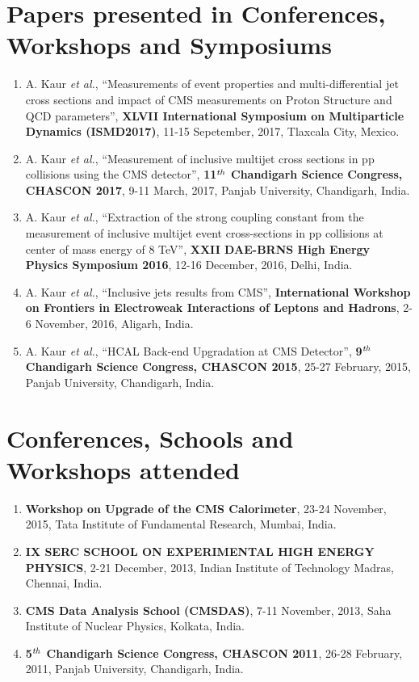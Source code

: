 \section*{Papers presented in Conferences, Workshops and Symposiums}
\begin{enumerate}
\item A. Kaur {\it et al.}, ``Measurements of event properties and multi-differential jet cross sections and impact of CMS measurements on Proton Structure and QCD parameters'', {\bf XLVII International Symposium on Multiparticle Dynamics (ISMD2017)}, 11-15 Sepetember, 2017, Tlaxcala City, Mexico.

\item A. Kaur {\it et al.}, ``Measurement of inclusive multijet cross sections in pp collisions using the CMS detector'', {\bf 11$^{\rm \it th}$ Chandigarh Science Congress, CHASCON 2017}, 9-11 March, 2017, Panjab University, Chandigarh, India.  

\item A. Kaur {\it et al.}, ``Extraction of the strong coupling constant from the measurement of inclusive multijet event cross-sections in pp collisions at center of mass energy of 8 TeV'', {\bf XXII DAE­-BRNS High Energy Physics Symposium 2016}, 12-16 December, 2016, Delhi, India.

\item A. Kaur {\it et al.}, ``Inclusive jets results from CMS'', {\bf International Workshop on Frontiers in Electroweak Interactions of Leptons and Hadrons}, 2-6 November, 2016, Aligarh, India.

\item A. Kaur {\it et al.}, ``HCAL Back-end Upgradation at CMS Detector'', {\bf 9$^{\rm \it th}$ Chandigarh Science Congress, CHASCON 2015}, 25-27 February, 2015, Panjab University, Chandigarh, India.

\end{enumerate}

\noindent\makebox[\textwidth]{\rule{\textwidth}{1pt}} 

\section*{Conferences, Schools and Workshops attended}

\begin{enumerate}

\item {\bf Workshop on Upgrade of the CMS Calorimeter}, 23-24 November, 2015, Tata Institute of Fundamental Research, Mumbai, India.

\item {\bf IX SERC SCHOOL ON EXPERIMENTAL HIGH ENERGY PHYSICS}, 2-21 December, 2013, Indian Institute of Technology Madras, Chennai, India. 

\item {\bf CMS Data Analysis School (CMSDAS)}, 7-11 November, 2013, Saha Institute of Nuclear Physics, Kolkata, India.

\item {\bf 5$^{\it th}$ Chandigarh Science Congress, CHASCON 2011}, 26-28 February, 2011, Panjab University, Chandigarh, India.
\end{enumerate}

